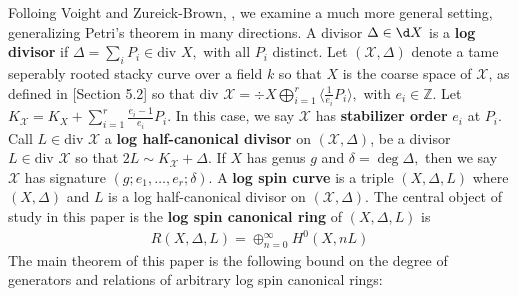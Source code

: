 \documentclass{amsart}
\theoremstyle{plain}
\theoremstyle{definition}
\theoremstyle{remark}
\numberwithin{equation}{section}
\newcommand\BZ{{\mathbb Z}}
\newcommand \sx{\mathscr X}
\newcommand \di{\text{div }}
\newcommand \halfcan{L}
\begin{document}
Folloing Voight and Zureick-Brown, \cite{vzb:stacky}, we examine a much more general setting, generalizing Petri's theorem in many directions.
A divisor $\Delta \in \d X$ is a {\bf log divisor} if $\Delta = \sum_{i}^{}P_i \in \di X,$ with all $P_i$ distinct. Let $(\sx,\Delta)$ denote a tame seperably rooted stacky curve over a field $k$ so that $X$ is the coarse space of $\sx$, as defined in \cite{vzb:stacky}[Section 5.2] so that $\di \sx = \div X \bigoplus_{i=1}^r \langle \frac{1}{e_i}P_i \rangle,$ with $e_i \in \BZ$. Let $K_\sx = K_X + \sum_{i=1}^{r}\frac{e_i-1}{e_i}P_i.$ In this case, we say $\sx$ has {\bf stabilizer order} $e_i$ at $P_i$. Call $\halfcan \in \di \sx$ a {\bf log half-canonical divisor} on $(\sx,\Delta)$, be a divisor $\halfcan \in \di \sx$ so that $2\halfcan \sim K_\sx + \Delta.$ If $X$ has genus $g$ and $\delta = \deg \Delta,$ then we say $\sx$ has signature $(g;e_1,\ldots, e_r;\delta)$. A {\bf log spin curve} is a triple $(X,\Delta,\halfcan)$ where $(X,\Delta)$ and $\halfcan$ is a log half-canonical divisor on $(\sx,\Delta)$. The central object of study in this paper is the {\bf log spin canonical ring} of $(X,\Delta,L)$ is
\begin{align*}
	R(X,\Delta,L) = \oplus_{n=0}^\infty H^0(X,nL)
\end{align*}
The main theorem of this paper is the following bound on the degree of generators and relations of arbitrary log spin canonical rings:
\end{document}
